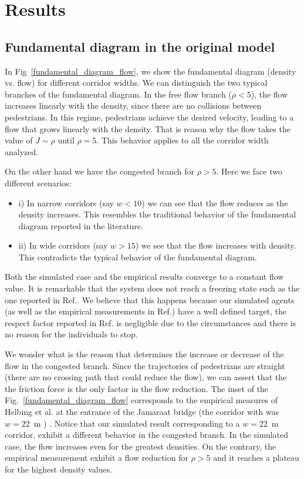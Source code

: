 \section{\label{results}Results}

\subsection{\label{fundamental_diagram} Fundamental diagram in the original model}

In Fig~\ref{fundamental_diagram_flow}, we show the fundamental diagram (density vs. flow) for different corridor widths. We can distinguish the two typical branches of the fundamental diagram. In the free flow branch ($\rho < 5$), the flow increases linearly with the density, since there are no collisions between pedestrians. In this regime, pedestrians achieve the desired velocity, leading to a flow that grows linearly with the density. That is reason why the flow takes the value of $J \sim \rho$ until $\rho=5$. This behavior applies to all the corridor width analyzed. 

On the other hand we have the congested branch  for $\rho > 5$. Here we face two different scenarios:

\begin{itemize}
\item i) In narrow corridors (say $w < 10$) we can see that the flow reduces as the density increases. This resembles the traditional behavior of the fundamental diagram reported in the literature. 
\item ii) In wide corridors (say $w > 15$) we see that the flow increases with density. This contradicts the typical behavior of the fundamental diagram.   
\end{itemize}

Both the simulated case and the empirical results converge to a constant flow value. It is remarkable that the system does not reach a freezing state such as the one reported in Ref.\cite{kwak}. We believe that this happens because our simulated agents (as well as the empirical measurements in Ref.\cite{helbing3}) have a well defined target, the respect factor reported in Ref.\cite{parisi2} is negligible due to the circumstances and there is no reason for the individuals to stop.

We wonder what is the reason that determines the increase or decrease of the flow in the congested branch. Since the trajectories of pedestrians are straight (there are no crossing path that could reduce the flow), we can assert that the the friction force is the only factor in the flow reduction. The inset of the Fig.~\ref{fundamental_diagram_flow} corresponds to the empirical measures of Helbing et al. at the entrance of the Jamaraat bridge (the corridor with was $w=22$~m ) \cite{helbing3}. Notice that our simulated result corresponding to a $w=22$~m corridor, exhibit a different behavior in the congested branch. In the simulated case, the flow increases even for the greatest densities. On the contrary, the empirical measurement exhibit a flow reduction for $\rho > 5$ and it reaches a plateau for the highest density values.  

